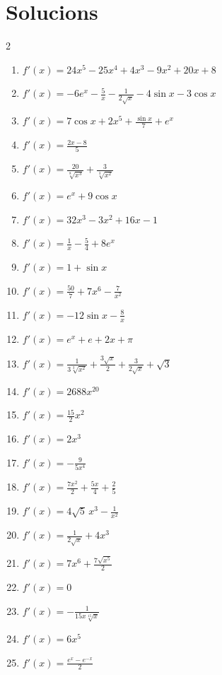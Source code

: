 \documentclass[12pt,a4paper]{article}
\begin{document}
\newpage
\section*{Solucions}

\begin{multicols}{2}
\begin{enumerate}
    \item $f'(x) = 24x^5 - 25x^4 + 4x^3 - 9x^2 + 20x + 8$
    \item $f'(x) = -6e^x - \frac{5}{x} - \frac{1}{2\sqrt{x}} - 4\sin x - 3\cos x$
    \item $f'(x) = 7\cos x + 2x^5 + \frac{\sin x}{7} + e^x$
    \item $f'(x) = \frac{2x - 8}{5}$
    \item $f'(x) = \frac{20}{\sqrt[8]{x^3}} + \frac{3}{\sqrt[3]{x^2}}$
    \item $f'(x) = e^x + 9\cos x$
    \item $f'(x) = 32x^3 - 3x^2 + 16x - 1$
    \item $f'(x) = \frac{1}{x} - \frac{5}{4} + 8e^x$
    \item $f'(x) = 1 + \sin x$
    \item $f'(x) = \frac{50}{7} + 7x^6 - \frac{7}{x^2}$
    \item $f'(x) = -12\sin x - \frac{8}{x}$
    \item $f'(x) = e^x + e + 2x + \pi$
    \item $f'(x) = \frac{1}{3\sqrt[3]{x^2}} + \frac{3\sqrt{x}}{2} + \frac{3}{2\sqrt{x}} + \sqrt{3}$
    \item $f'(x) = 2688x^{20}$
    \item $f'(x) = \frac{15}{2}x^2$
    \item $f'(x) = 2x^3$
    \item $f'(x) = -\frac{9}{5x^4}$
    \item $f'(x) = \frac{7x^2}{2} + \frac{5x}{4} + \frac{2}{5}$
    \item $f'(x) = 4\sqrt{5}\,x^3 - \frac{1}{x^2}$
    \item $f'(x) = \frac{1}{2\sqrt{x}} + 4x^3$
    \item $f'(x) = 7x^6 + \frac{7\sqrt{x^5}}{2}$
    \item $f'(x) = 0$
    \item $f'(x) = -\frac{1}{15x\sqrt[15]{x}}$
    \item $f'(x) = 6x^5$
    \item $f'(x) = \frac{e^x - e^{-x}}{2}$
\end{enumerate}
\end{multicols}
\end{document}
